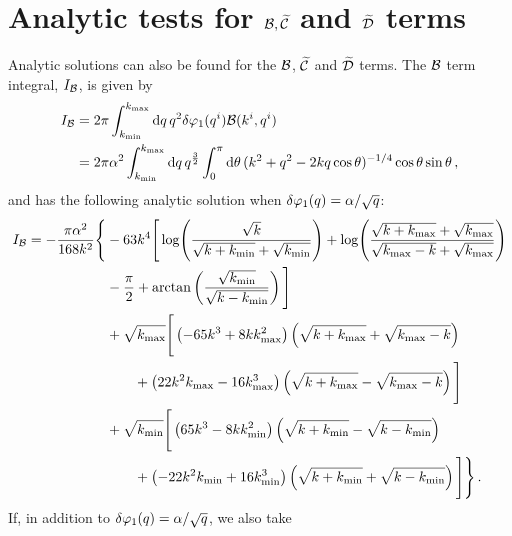 \section{Analytic tests for \texorpdfstring{$\mathcal{B},\widetilde{\mathcal{C}}$ and $\widetilde{\mathcal{D}}$}{B, C and D} terms}
\label{sec:apx-codetests}

% 
% 
Analytic solutions can also be found for the $\mathcal{B}$, $\widetilde{\mathcal{C}}$ and $\widetilde{\mathcal{D}}$ terms.
The $\mathcal{B}$ term integral, $I_{\mathcal{B}}$, is given by
% 
\begin{align}
 \label{eq:bintegral-num}
I_\B &= 2\pi \int_{\kmin}^{\kmax} \d q\, q^2\dvp1(\qvi)\B(\kvi,\qvi) \nonumber\\
% 
     &= 2\pi\alpha^2 \int_{\kmin}^{\kmax} \d q\, q^{\frac{3}{2}}
\int_{0}^{\pi} \d\theta\, (k^2 + q^2 -2k q \cos{\theta})^{-1/4}
\cos{\theta}\sin{\theta}\,,
\end{align}
% 
and has the following analytic solution when $\delta\varphi_{1}(q) = \alpha/\sqrt{q}$:
% 
\begin{align}
\label{eq:intb-soln-num}
 I_\B = -\frac{\pi\alpha^2}{168 k^2}\Bigg\{ 
        &-63 k^4 \Bigg[ \log\Biggl(\frac{\sqrt{k}}{\sqrt{k+\kmin} + \sqrt{\kmin}}
                            \Biggr)
         + \log\Biggl( \frac{\sqrt{k+\kmax} +\sqrt{\kmax}}{\sqrt{\kmax-k} +
                      \sqrt{\kmax}}\Biggr) \nonumber \\
        &-\frac{\pi}{2} + \arctan\left( \frac{\sqrt{\kmin}}{\sqrt{k-\kmin}}\right)
        \Bigg] \nonumber\\
% 
        &+\sqrt{\kmax}\Bigg[ \left(-65k^3 + 8k\kmax^2 \right)\left(\sqrt{k+\kmax} +
          \sqrt{\kmax-k}\right) \nonumber \\
        &\qquad +\left(22k^2\kmax -16\kmax^3\right) \left(\sqrt{k+\kmax} -
         \sqrt{\kmax -k} \right) \Bigg] \nonumber \\
        &+\sqrt{\kmin}\Bigg[ \left(65k^3 - 8k\kmin^2 \right)\left(\sqrt{k+\kmin} -
          \sqrt{k-\kmin}\right) \nonumber \\
        &\qquad +\left(-22k^2\kmin +16\kmin^3\right) \left(\sqrt{k+\kmin} +
         \sqrt{k-\kmin} \right) \Bigg] \Bigg\} \,.
\end{align}
% 
If, in addition to $\delta\varphi_{1}(q) = \alpha/\sqrt{q}$, we also take
